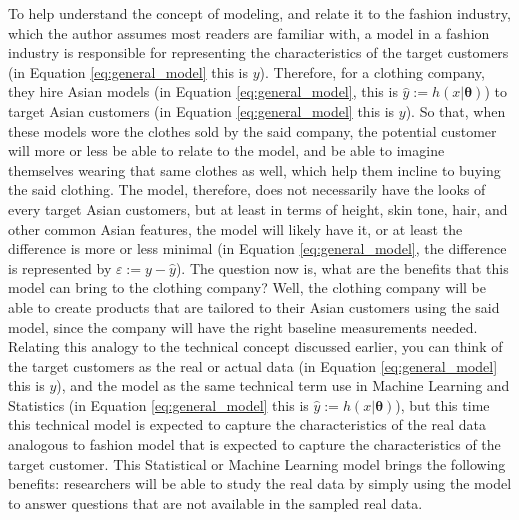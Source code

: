 To help understand the concept of modeling, and relate it to the fashion industry, which the author assumes most readers are familiar with, a model in a fashion industry is responsible for representing the characteristics of the target customers (in Equation \ref{eq:general_model} this is $y$). Therefore, for a clothing company, they hire Asian models (in Equation \ref{eq:general_model}, this is $\hat{y}:=h(x|\boldsymbol{\theta})$) to target Asian customers (in Equation \ref{eq:general_model} this is $y$). So that, when these models wore the clothes sold by the said company, the potential customer will more or less be able to relate to the model, and be able to imagine themselves wearing that same clothes as well, which help them incline to buying the said clothing. The model, therefore, does not necessarily have the looks of every target Asian customers, but at least in terms of height, skin tone, hair, and other common Asian features, the model will likely have it, or at least the difference is more or less minimal (in Equation \ref{eq:general_model}, the difference is represented by $\varepsilon:=y-\hat{y}$). The question now is, what are the benefits that this model can bring to the clothing company? Well, the clothing company will be able to create products that are tailored to their Asian customers using the said model, since the company will have the right baseline measurements needed. Relating this analogy to the technical concept discussed earlier, you can think of the target customers as the
real or actual data (in Equation \ref{eq:general_model} this is $y$), and the model as the same technical term use in Machine Learning and Statistics (in Equation \ref{eq:general_model} this is $\hat{y}:=h(x|\boldsymbol{\theta})$), but this time this technical model is expected to capture the characteristics of the real data analogous to fashion model that is expected to capture the characteristics of the target customer. This Statistical or Machine Learning model brings the following benefits: researchers will be able to study the real data by simply using the model to answer questions that are not available in the sampled real data.

